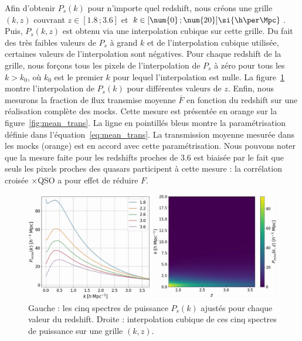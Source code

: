Afin d'obtenir $P_{s}(k)$ pour n'importe quel redshift, nous créons une grille $(k, z)$ couvrant $z \in [\num{1.8} \, ; \num{3.6}]$ et $k \in [\num{0} \, ; \num{20}] \si{\h\per\Mpc}$.
Puis, $P_{s}(k,z)$ est obtenu via une interpolation cubique sur cette grille. Du fait des très faibles valeurs de $P_{s}$ à grand $k$ et de l'interpolation cubique utilisée, certaines valeurs de l'interpolation sont négatives. Pour chaque redshift de la grille, nous forçons tous les pixels de l'interpolation de $P_{s}$ à zéro pour tous les $k > k_0$, où $k_0$ est le premier $k$ pour lequel l'interpolation est nulle. La figure~\ref{fig:p1dmiss} montre l'interpolation de $P_{s}(k)$ pour différentes valeurs de $z$.
Enfin, nous mesurons la fraction de flux transmise moyenne $\overline F$ en fonction du redshift sur une réalisation complète des mocks. Cette mesure est présentée en orange sur la figure~\ref{fig:mean_trans}.
La ligne en pointillés bleus montre la paramétrisation définie dans l'équation~\ref{eq:mean_trans}. La transmission moyenne mesurée dans les mocks (orange) est en accord avec cette paramétrisation.
Nous pouvons noter que la mesure faite pour les redshifts proches de \num{3.6} est biaisée par le fait que seuls les pixels proches des quasars participent à cette mesure : la corrélation croisée \lya{}$\times$QSO a pour effet de réduire $F$.
\begin{figure}
  \centering
  \includegraphics[scale=0.4]{p1dmiss}
  \caption{Gauche : les cinq spectres de puissance $P_{s}(k)$ ajustés pour chaque valeur du redshift. Droite : interpolation cubique de ces cinq spectres de puissance sur une grille $(k, z)$.}
  \label{fig:p1dmiss}
\end{figure}
